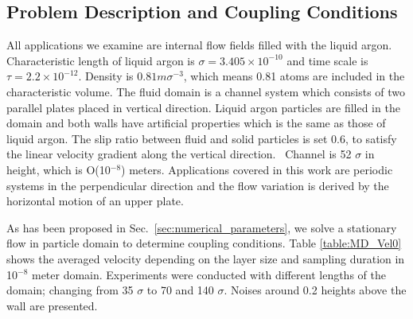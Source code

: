 \documentclass[preprint,12pt]{elsarticle}
\begin{document}
\subsection{Problem Description and Coupling Conditions}
\label{sec:accuracy_conditions}

All applications we examine are internal flow fields filled with the liquid argon. Characteristic length of liquid argon is ${\sigma}=3.405{\times}10^{-10}$ and time scale is $\tau=2.2{\times}10^{-12}$. Density is $0.81m{\sigma}^{-3}$, which means 0.81 atoms are included in the characteristic volume.
The fluid domain is a channel system which consists of two parallel plates placed in vertical direction. Liquid argon particles are filled in the domain and both walls have artificial properties which is the same as those of liquid argon. The slip ratio between fluid and solid particles is set 0.6, to satisfy the linear velocity gradient along the vertical direction.~\cite{Nie}
Channel is 52 $\sigma$ in height, which is O(10$^{-8}$) meters. Applications covered in this work are periodic systems in the perpendicular direction and the flow variation is derived by the horizontal motion of an upper plate.


As has been proposed in Sec.~\ref{sec:numerical_parameters}, we solve a stationary flow in particle domain to determine coupling conditions. Table \ref{table:MD_Vel0} shows the averaged velocity depending on the layer size and sampling duration in 10$^{-8}$ meter domain. Experiments were conducted with different lengths of the domain; changing from 35 $\sigma$ to 70 and 140 $\sigma$. Noises around 0.2 heights above the wall are presented.
\end{document}
